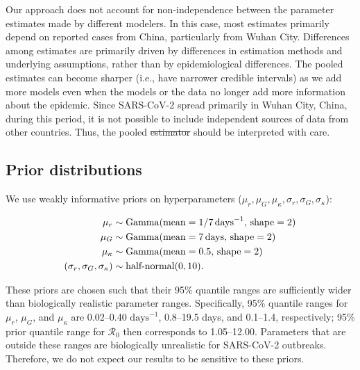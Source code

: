 \documentclass[12pt]{article}
\newcommand{\Ro}{\ensuremath{{\mathcal R}_{0}}\xspace}
\providecommand{\DIFaddtex}[1]{{\protect\color{blue}\uwave{#1}}} %
\providecommand{\DIFdeltex}[1]{{\protect\color{red}\sout{#1}}}                      %
\providecommand{\DIFaddbegin}{} %
\providecommand{\DIFaddend}{} %
\providecommand{\DIFdelbegin}{} %
\providecommand{\DIFdelend}{} %
\providecommand{\DIFadd}[1]{\texorpdfstring{\DIFaddtex{#1}}{#1}} %
\providecommand{\DIFdel}[1]{\texorpdfstring{\DIFdeltex{#1}}{}} %
\newcommand{\DIFscaledelfig}{0.5}
\newlength{\DIFdelgraphicswidth} %
\newlength{\DIFdelgraphicsheight} %
\newcommand{\DIFaddincludegraphics}[2][]{{\color{blue}\fbox{\DIFOincludegraphics[#1]{#2}}}} %
\newcommand{\DIFdelincludegraphics}[2][]{%
\sbox{\DIFdelgraphicsbox}{\DIFOincludegraphics[#1]{#2}}%
\settoboxwidth{\DIFdelgraphicswidth}{\DIFdelgraphicsbox} %
\settoboxtotalheight{\DIFdelgraphicsheight}{\DIFdelgraphicsbox} %
\scalebox{\DIFscaledelfig}{%
\parbox[b]{\DIFdelgraphicswidth}{\usebox{\DIFdelgraphicsbox}\\[-\baselineskip] \rule{\DIFdelgraphicswidth}{0em}}\llap{\resizebox{\DIFdelgraphicswidth}{\DIFdelgraphicsheight}{%
\setlength{\unitlength}{\DIFdelgraphicswidth}%
\begin{picture}(1,1)%
\thicklines\linethickness{2pt} %
{\color[rgb]{1,0,0}\put(0,0){\framebox(1,1){}}}%
{\color[rgb]{1,0,0}\put(0,0){\line( 1,1){1}}}%
{\color[rgb]{1,0,0}\put(0,1){\line(1,-1){1}}}%
\end{picture}%
}\hspace*{3pt}}} %
} %
\DeclareRobustCommand{\DIFaddbegin}{\DIFOaddbegin \let\includegraphics\DIFaddincludegraphics} %
\DeclareRobustCommand{\DIFaddend}{\DIFOaddend \let\includegraphics\DIFOincludegraphics} %
\DeclareRobustCommand{\DIFdelbegin}{\DIFOdelbegin \let\includegraphics\DIFdelincludegraphics} %
\DeclareRobustCommand{\DIFdelend}{\DIFOaddend \let\includegraphics\DIFOincludegraphics} %
\begin{document}
Our approach does not account for non-independence between the parameter estimates made by different modelers.
In this case, most estimates primarily depend on reported cases from China, particularly from Wuhan City.
Differences among estimates are primarily driven by differences in estimation methods and underlying assumptions, rather than by epidemiological differences.
The pooled estimates can become sharper (i.e., have narrower credible intervals) as we add more models even when the models or the data no longer add more information about the epidemic.
Since SARS-CoV-2 spread primarily in Wuhan City, China, during this period, it is not possible to include independent sources of data from other countries.
Thus, the pooled \DIFdelbegin \DIFdel{estimator }\DIFdelend \DIFaddbegin \DIFadd{estimates }\DIFaddend should be interpreted with care.

\subsection{Prior distributions}

We use weakly informative priors on hyperparameters ($\mu_r, \mu_G, \mu_\kappa, \sigma_r, \sigma_G, \sigma_\kappa$):
\begin{linenomath*}
\begin{equation}
\begin{aligned}
\mu_r &\sim \mathrm{Gamma}(\mathrm{mean}=1/7\,\mathrm{days}^{-1},\,\mathrm{shape}=2)\\
\mu_G &\sim \mathrm{Gamma}(\mathrm{mean}=7\,\mathrm{days},\,\mathrm{shape}=2)\\
\mu_\kappa &\sim \mathrm{Gamma}(\mathrm{mean}=0.5,\,\mathrm{shape}=2)\\
(\sigma_r, \sigma_G, \sigma_\kappa) &\sim \textrm{half-normal}(0, 10).
\end{aligned}
\end{equation}
\end{linenomath*}
These priors are chosen such that their 95\% quantile ranges are sufficiently wider than biologically realistic parameter ranges.
Specifically, 95\% quantile ranges for $\mu_r$, $\mu_G$, and $\mu_\kappa$ are 0.02--0.40 $\mathrm{days}^{-1}$, 0.8--19.5 days, and 0.1--1.4, respectively;
95\% prior quantile range for \Ro then corresponds to 1.05--12.00.
Parameters that are outside these ranges are biologically unrealistic for SARS-CoV-2 outbreaks.
Therefore, we do not expect our results to be sensitive to these priors.
\end{document}
